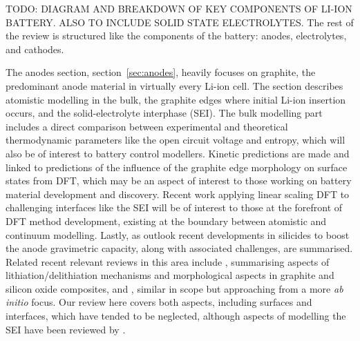 \documentclass[../main.tex]{subfiles}
\begin{document}
TODO: DIAGRAM AND BREAKDOWN OF KEY COMPONENTS OF LI-ION BATTERY. ALSO TO INCLUDE SOLID STATE ELECTROLYTES. The rest of the review is structured like the components of the battery: anodes, electrolytes, and cathodes.

The anodes section, section~\ref{sec:anodes}, heavily focuses on graphite, the predominant anode material in virtually every Li-ion cell. The section describes atomistic modelling in the bulk, the graphite edges where initial Li-ion insertion occurs, and the solid-electrolyte interphase (SEI). The bulk modelling part includes a direct comparison between experimental and theoretical thermodynamic parameters like the open circuit voltage and entropy, which will also be of interest to battery control modellers. Kinetic predictions are made and linked to predictions of the influence of the graphite edge morphology on surface states from DFT, which may be an aspect of interest to those working on battery material development and discovery. Recent work applying linear scaling DFT to challenging interfaces like the SEI will be of interest to those at the forefront of DFT method development, existing at the boundary between atomistic and continuum modelling. Lastly, as outlook recent developments in silicides to boost the anode gravimetric capacity, along with associated challenges, are summarised. Related recent relevant reviews in this area include \citeauthor{asenbauer_success_2020} \cite{asenbauer_success_2020}, summarising aspects of lithiation/delithiation mechanisms and morphological aspects in graphite and silicon oxide composites, and \citeauthor{ZHANG2021147} \cite{ZHANG2021147}, similar in scope but approaching from a more \textit{ab initio} focus. Our review here covers both aspects, including surfaces and interfaces, which have tended to be neglected, although aspects of modelling the SEI have been reviewed by \citeauthor{Wang2018} \cite{Wang2018}.
\end{document}
